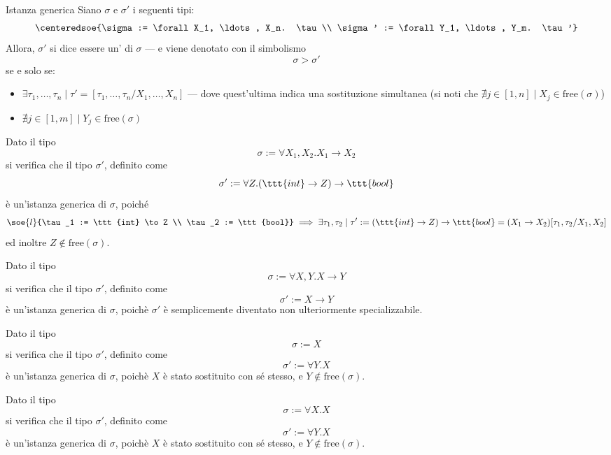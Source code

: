 \documentclass[a4paper, 12pt]{report}
\begin{document}
    \begin{frameddefn}{Istanza generica}
        Siano $\sigma$ e $\sigma'$ i seguenti tipi: $$\centeredsoe{\sigma := \forall X_1, \ldots, X_n. \tau \\ \sigma' := \forall Y_1, \ldots, Y_m. \tau'}$$ Allora, $\sigma'$ si dice essere un' di $\sigma$ --- e viene denotato con il simbolismo $$\sigma > \sigma '$$ se e solo se:

        \begin{itemize}
            \item $\exists \tau_1, \ldots, \tau_n \mid \tau' = [\tau_1, \ldots , \tau_n/X_1, \ldots, X_n]$ --- dove quest'ultima indica una sostituzione simultanea (si noti che $\nexists j \in [1, n] \mid X_j \in \mathrm{free}(\sigma)$)
            \item $\nexists j \in [1, m] \mid Y_j \in \mathrm{free}(\sigma)$
        \end{itemize}
    \end{frameddefn}

    \begin{example}
        Dato il tipo $$\sigma := \forall X_1, X_2.X_1 \to X_2$$ si verifica che il tipo $\sigma'$, definito come $$\sigma' := \forall Z. (\ttt{int} \to Z) \to \ttt{bool}$$ è un'istanza generica di $\sigma$, poiché $$\soe{l}{\tau_1 := \ttt{int} \to Z \\ \tau_2 := \ttt{bool}} \implies \exists \tau_1, \tau_2 \mid \tau' := (\ttt{int} \to Z) \to \ttt{bool} = (X_1 \to X_2)[\tau_1, \tau_2/X_1, X_2]$$ ed inoltre $Z \notin \mathrm{free}(\sigma)$.
    \end{example}

    \begin{example}
        Dato il tipo $$\sigma := \forall X,Y.X \to Y$$ si verifica che il tipo $\sigma'$, definito come $$\sigma' := X \to Y$$ è un'istanza generica di $\sigma$, poichè $\sigma'$ è semplicemente diventato non ulteriormente specializzabile.
    \end{example}

    \begin{example}
        Dato il tipo $$\sigma := X$$ si verifica che il tipo $\sigma'$, definito come $$\sigma' := \forall Y.X$$ è un'istanza generica di $\sigma$, poichè $X$ è stato sostituito con sé stesso, e $Y \notin \mathrm{free}(\sigma)$.
    \end{example}

    \begin{example}
        Dato il tipo $$\sigma := \forall X.X$$ si verifica che il tipo $\sigma'$, definito come $$\sigma' := \forall Y.X$$ è un'istanza generica di $\sigma$, poichè $X$ è stato sostituito con sé stesso, e $Y \notin \mathrm{free}(\sigma)$.
    \end{example}
\end{document}
